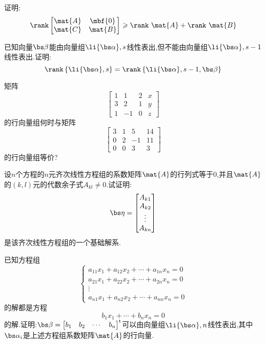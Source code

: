 \documentclass{ctexart}
\begin{document}
\begin{homework}[5]
    证明:
    \[\rank\begin{bmatrix}
        \mat{A}&\mbf{0}\\
        \mat{C}&\mat{B}
    \end{bmatrix}\geqslant\rank\ \mat{A}+\rank\ \mat{B}\]
\end{homework}
\begin{homework}[6]
    已知向量$\bs\beta$能由向量组$\li{\bs\alpha},s$线性表出,但不能由向量组$\li{\bs\alpha},{s-1}$线性表出.证明:
    \[\rank\left\{\li{\bs\alpha},s\right\}=\rank\left\{\li{\bs\alpha},{s-1},\bs\beta\right\}\]
\end{homework}
\begin{homework}[7]
    矩阵
    \[\begin{bmatrix}
        1&1&2&x\\
        3&2&1&y\\
        1&-1&0&z
    \end{bmatrix}\]
    的行向量组何时与矩阵
    \[\begin{bmatrix}
        3&1&5&14\\
        0&2&-1&11\\
        0&0&3&3
    \end{bmatrix}\]
    的行向量组等价?
\end{homework}
\begin{homework}[8]
    设$n$个方程的$n$元齐次线性方程组的系数矩阵$\mat{A}$的行列式等于$0$,并且$\mat{A}$的$(k,l)$元的代数余子式$A_{kl}\neq0$.试证明:
    \[\bs\eta=\begin{bmatrix}
        A_{k1}\\A_{k2}\\\vdots\\A_{kn}
    \end{bmatrix}\]
    是该齐次线性方程组的一个基础解系.
\end{homework}
\begin{homework}[9]
    已知方程组
    \[\left\{\begin{array}{c}
        a_{11}x_1+a_{12}x_2+\cdots+a_{1n}x_n=0\\
        a_{21}x_1+a_{22}x_2+\cdots+a_{2n}x_n=0\\
        \vdots\\
        a_{n1}x_1+a_{n2}x_2+\cdots+a_{nn}x_n=0
    \end{array}\right.\]
    的解都是方程
    \[b_1x_1+\cdots+b_nx_n=0\]
    的解.证明:$\bs\beta=\begin{bmatrix}
        b_1&b_2&\cdots&b_n
    \end{bmatrix}^{\text{t}}$可以由向量组$\li{\bs\alpha},n$线性表出,其中$\bs\alpha_i$是上述方程组系数矩阵$\mat{A}$的行向量.
\end{homework}
\end{document}
